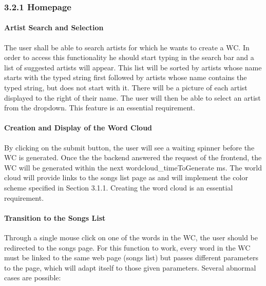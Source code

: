 \documentclass[]{article}
\begin{document}
\subsubsection{3.2.1 Homepage}\label{homepage}

\paragraph{Artist Search and
Selection}\label{artist-search-and-selection}

The user shall be able to search artists for which he wants to create a
WC. In order to access this functionality he should start typing in the
search bar and a list of suggested artists will appear. This list will
be sorted by artists whose name starts with the typed string first
followed by artists whose name contains the typed string, but does not
start with it. There will be a picture of each artist displayed to the
right of their name. The user will then be able to select an artist from
the dropdown. This feature is an essential requirement.

\paragraph{Creation and Display of the Word
Cloud}\label{creation-and-display-of-the-word-cloud}

By clicking on the submit button, the user will see a waiting spinner
before the WC is generated. Once the the backend answered the request of
the frontend, the WC will be generated within the next
wordcloud\_timeToGenerate ms. The world cloud will provide links to the
songs list page as and will implement the color scheme specified in
Section 3.1.1. Creating the word cloud is an essential requirement.

\paragraph{Transition to the Songs
List}\label{transition-to-the-songs-list}

Through a single mouse click on one of the words in the WC, the user
should be redirected to the songs page. For this function to work, every
word in the WC must be linked to the same web page (songs list) but
passes different parameters to the page, which will adapt itself to
those given parameters. Several abnormal cases are possible:
\end{document}

